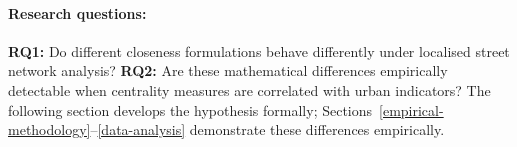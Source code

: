 \paragraph{Research questions:} \textbf{RQ1:} Do different closeness formulations behave differently under localised street network analysis? \textbf{RQ2:} Are these mathematical differences empirically detectable when centrality measures are correlated with urban indicators? The following section develops the hypothesis formally; Sections~\ref{empirical-methodology}--\ref{data-analysis} demonstrate these differences empirically.
